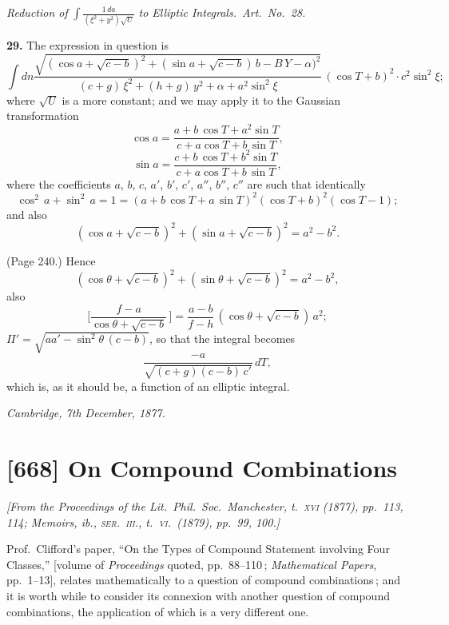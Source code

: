 \documentclass[11pt,a4paper]{book}
\begin{document}
\medskip

\noindent\textit{Reduction of} $\int \frac{1\,d a}{(\xi^2 + y^2)\sqrt{U}}$ \textit{to Elliptic Integrals.\ Art.\ No.\ 28.}

\medskip

\noindent\textbf{29.} The expression in question is
\[
\int dn \frac{\sqrt{(\cos a + \sqrt{c - b})^2 + (\sin a + \sqrt{c - b})\,b - B\,Y - \alpha)^2}}{(c + g)\,\xi^2 + (h + g)\,y^2 + \alpha + a^2 \sin^2 \xi}\,(\cos T + b)^2 \cdot c^2 \sin^2 \xi;
\]
where $\sqrt{U}$ is a more constant; and we may apply it to the Gaussian transformation
\[
\cos a = \frac{a + b\,\cos T + a^2 \sin T}{c + a\cos T + b\,\sin T},
\]
\[
\sin a = \frac{c + b\,\cos T + b^2 \sin T}{c + a \cos T + b\,\sin T},
\]
where the coefficients $a$, $b$, $c$, $a'$, $b'$, $c'$, $a''$, $b''$, $c''$ are such that identically
\[
\cos^2\,a + \sin^2\,a = 1 = (a + b\,\cos T + a\,\sin T)^2(\cos T + b)^2(\cos T - 1);
\]
and also
\[
(\cos a + \sqrt{c - b})^2 + (\sin a + \sqrt{c - b})^2 = a^2 - b^2.
\]

\medskip

\noindent (Page 240.) Hence
\[
(\cos\theta + \sqrt{c - b})^2 + (\sin\theta + \sqrt{c - b})^2 = a^2 - b^2,
\]
also
\[
\Big[\frac{f - a}{\cos\theta + \sqrt{c - b}}\,\Big] = \frac{a - b}{f - h} \,(\cos\theta + \sqrt{c - b})\,a^2;
\]
$ \Pi' = \sqrt{a a' - \sin^2 \theta\,(c - b)}$, so that the integral becomes
\[
\frac{- a}{\sqrt{(c + g)(c - b)\,c'}}\,d T,
\]
which is, as it should be, a function of an elliptic integral.

\medskip

\noindent\textit{Cambridge, 7th December, 1877.}

\bigskip

\section{[668] On Compound Combinations}
\label{sec:668}

\noindent\textit{[From the \emph{Proceedings of the Lit.\ Phil.\ Soc.\ Manchester}, t.~\textsc{xvi} (1877), pp.~113, 114; \emph{Memoirs, ib.,} \textsc{ser.\ iii.}, t.~\textsc{vi.}\ (1879), pp.\ 99, 100.]}

\medskip

\noindent Prof.\ Clifford's paper, ``On the Types of Compound Statement involving Four Classes,'' [volume of \emph{Proceedings} quoted, pp.~88--110\,; \emph{Mathematical Papers}, pp.~1--13], relates mathematically to a question of compound combinations\,; and it is worth while to consider its connexion with another question of compound combinations, the application of which is a very different one.
\end{document}
